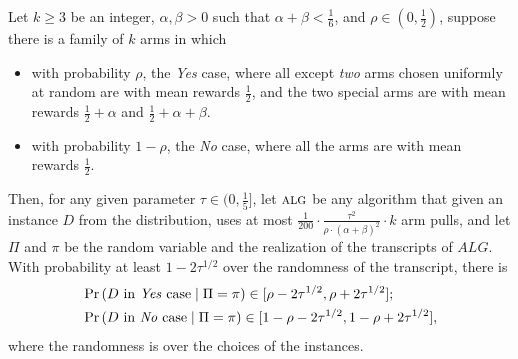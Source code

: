\begin{lemma}
	\label{lem:batch-arm-learning}
	Let $k\geq 3$ be an integer, $\alpha, \beta >0$ such that $\alpha+\beta<\frac{1}{6}$, and $\rho\in (0, \frac{1}{2})$, suppose there is a family of $k$ arms in which
	\begin{itemize}
		\item with probability $\rho$, the \emph{Yes} %
		case, where all except \emph{two} arms chosen uniformly at random are with mean rewards $\frac{1}{2}$, and the two special arms are with mean rewards $\frac{1}{2}+\alpha$ and $\frac{1}{2}+\alpha+\beta$.
		\item with probability $1- \rho$, the \emph{No} case, where all the arms are with mean rewards $\frac{1}{2}$.
	\end{itemize}
	Then, for any given parameter $\tau\in (0, \frac{1}{5}]$, let $\mbox{\sc alg}$ be any algorithm that given an instance $D$ from the distribution, uses at most $\frac{1}{200}\cdot \frac{\tau^2}{\rho \cdot (\alpha+\beta)^2}\cdot k$ arm pulls, and let $\Pi$ and $\pi$ be the random variable and the realization of the transcripts of $ALG$. With probability at least $1-2 \tau^{1/2}$ over the randomness of the transcript, there is
	\begin{align*}
		& \operatorname*{\textnormal{Pr}}\left(\text{$D$ in \emph{Yes} case} \mid \Pi=\pi\right) \in [\rho-2 \tau^{1/2}, \rho + 2 \tau^{1/2}];\\
		& \operatorname*{\textnormal{Pr}}\left(\text{$D$ in \emph{No} case} \mid \Pi=\pi\right) \in [1-\rho-2 \tau^{1/2}, 1-\rho + 2 \tau^{1/2}],
	\end{align*}
	where the randomness is over the choices of the instances.
\end{lemma}
